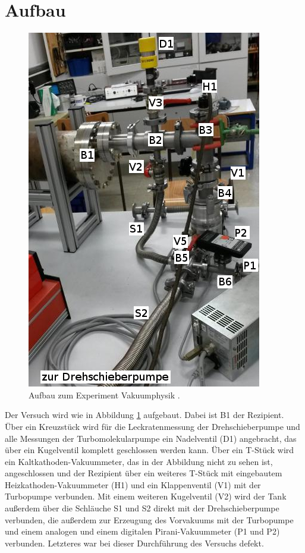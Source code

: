 
\section{Aufbau}
\label{sec:Aufbau}

\begin{figure}
\vspace{-0.5cm}
\includegraphics[scale=0.5]{content/images/Aufbau2.jpg}
\caption{Aufbau zum Experiment Vakuumphysik \cite{V70}.}
\label{fig:Aufbau}
\end{figure}

Der Versuch wird wie in Abbildung \ref{fig:Aufbau} aufgebaut. Dabei ist B1 der Rezipient. Über ein Kreuzstück wird für die Leckratenmessung der Drehschieberpumpe und alle Messungen der Turbomolekularpumpe ein Nadelventil (D1) angebracht, das über ein Kugelventil komplett geschlossen werden kann. Über ein T-Stück wird ein Kaltkathoden-Vakuummeter, das in der Abbildung nicht zu sehen ist, angeschlossen und der Rezipient über ein weiteres T-Stück mit eingebautem Heizkathoden-Vakuummeter (H1) und ein Klappenventil (V1) mit der Turbopumpe verbunden. Mit einem weiteren Kugelventil (V2) wird der Tank außerdem über die Schläuche S1 und S2 direkt mit der Drehschieberpumpe verbunden, die außerdem zur Erzeugung des Vorvakuums mit der Turbopumpe und einem analogen und einem digitalen Pirani-Vakuummeter (P1 und P2) verbunden. Letzteres war bei dieser Durchführung des Versuchs defekt.


